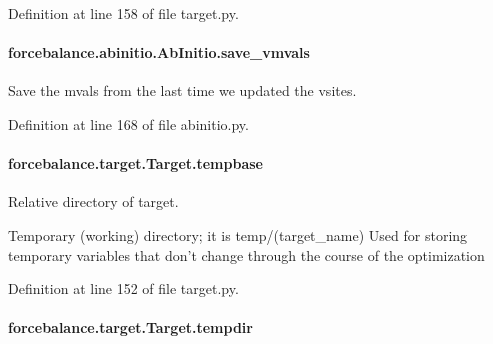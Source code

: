 Definition at line 158 of file target.\-py.

\hypertarget{classforcebalance_1_1abinitio_1_1AbInitio_a22037bf43728fa45f387390005e0b131}{
\paragraph[{save\-\_\-vmvals}]{\setlength{\rightskip}{0pt plus 5cm}forcebalance.\-abinitio.\-Ab\-Initio.\-save\-\_\-vmvals\hspace{0.3cm}{\ttfamily [inherited]}}}\label{classforcebalance_1_1abinitio_1_1AbInitio_a22037bf43728fa45f387390005e0b131}


Save the mvals from the last time we updated the vsites. 



Definition at line 168 of file abinitio.\-py.

\hypertarget{classforcebalance_1_1target_1_1Target_ae5b544d3e11365865813ef3d626ef81d}{
\paragraph[{tempbase}]{\setlength{\rightskip}{0pt plus 5cm}forcebalance.\-target.\-Target.\-tempbase\hspace{0.3cm}{\ttfamily [inherited]}}}\label{classforcebalance_1_1target_1_1Target_ae5b544d3e11365865813ef3d626ef81d}


Relative directory of target. 

Temporary (working) directory; it is temp/(target\-\_\-name) Used for storing temporary variables that don't change through the course of the optimization 

Definition at line 152 of file target.\-py.

\hypertarget{classforcebalance_1_1target_1_1Target_aa1f01b5b78db253b5b66384ed11ed193}{
\paragraph[{tempdir}]{\setlength{\rightskip}{0pt plus 5cm}forcebalance.\-target.\-Target.\-tempdir\hspace{0.3cm}{\ttfamily [inherited]}}}\label{classforcebalance_1_1target_1_1Target_aa1f01b5b78db253b5b66384ed11ed193}


